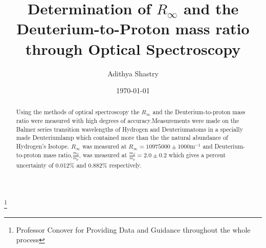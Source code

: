 \documentclass[%
 aps,%
 pra,%
 preprint, %
 amsmath, %
 amsfonts, %
 amssymb, %
]{revtex4-2}
\newcommand{\D}{Deuterium}
\newcommand{\Rin}{$R_\infty$ }
\begin{document}

\title{Determination of $R_{\infty}$ and the \D-to-Proton mass ratio through Optical Spectroscopy}
\thanks{Professor Conover for Providing Data and Guidance throughout the whole process}%

\author{Adithya Shastry} %
%





\date{\today}%




\begin{abstract}  %
Using the methods of optical spectroscopy the \Rin and the \D-to-proton mass ratio were measured with high degrees of accuracy.Measurements were made on the Balmer series transition wavelengths of Hydrogen and \D  atoms in a specially made \D  lamp which contained more than the the natural abundance of Hydrogen's Isotope. \Rin was measured at $R_{\infty}=10975000 \pm 1000 \text{m}^{-1}$ and \D-to-proton mass ratio,$\frac{m_d}{m_p}$, was measured at $\frac{m_d}{m_p}=2.0 \pm 0.2$ which gives a percent uncertainty of 0.012\% and 0.882\% respectively. 
\end{abstract}


\maketitle 

\newpage
\end{document}
